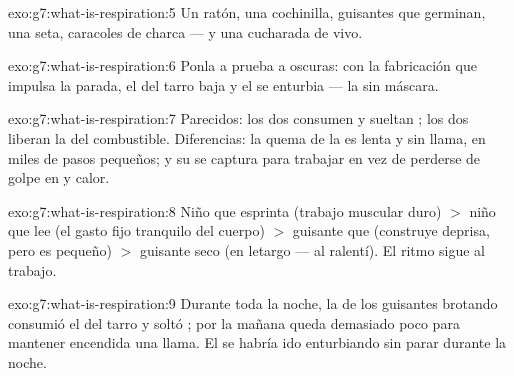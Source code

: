 \begin{solution}{exo:g7:what-is-respiration:5}
Un ratón, una cochinilla, guisantes que germinan, una seta, caracoles
de charca --- y una cucharada de  vivo.
\end{solution}

\begin{solution}{exo:g7:what-is-respiration:6}
Ponla a prueba a oscuras: con la fabricación que impulsa la  parada,
el  del tarro baja y el  se enturbia --- la
 sin máscara.
\end{solution}

\begin{solution}{exo:g7:what-is-respiration:7}
Parecidos: los dos consumen  y sueltan ; los
dos liberan la  del combustible. Diferencias: la quema de la
 es lenta y sin llama, en miles de pasos pequeños; y su 
se captura para trabajar en vez de perderse de golpe en  y calor.
\end{solution}

\begin{solution}{exo:g7:what-is-respiration:8}
Niño que esprinta (trabajo muscular duro) $>$ niño que lee (el gasto
fijo tranquilo del cuerpo) $>$ guisante que  (construye deprisa,
pero es pequeño) $>$ guisante seco (en letargo ---  al
ralentí). El ritmo sigue al trabajo.
\end{solution}

\begin{solution}{exo:g7:what-is-respiration:9}
Durante toda la noche, la  de los guisantes brotando consumió
el  del tarro y soltó ; por la mañana queda
demasiado poco  para mantener encendida una llama. El 
se habría ido enturbiando sin parar durante la noche.
\end{solution}


